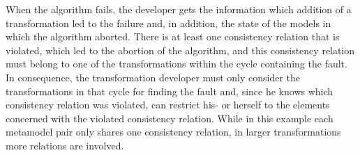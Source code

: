 When the algorithm fails, the developer gets the information which addition of a transformation led to the failure and, in addition, the state of the models in which the algorithm aborted.
There is at least one consistency relation that is violated, which led to the abortion of the algorithm, and this consistency relation must belong to one of the transformations within the cycle containing the fault.
In consequence, the transformation developer must only consider the transformations in that cycle for finding the fault and, since he knows which consistency relation was violated, can restrict his- or herself to the elements concerned with the violated consistency relation.
While in this example each metamodel pair only shares one consistency relation, in larger transformations more relations are involved.

